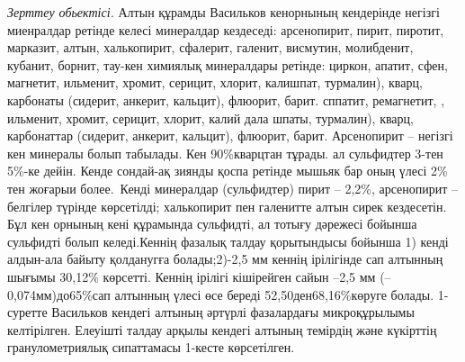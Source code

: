 \emph{Зерттеу обьектісі.} Алтын құрамды Васильков кенорнының кендерінде
негізгі миенралдар ретінде келесі минералдар кездеседі: арсенопирит,
пирит, пиротит, марказит, алтын, халькопирит, сфалерит, галенит,
висмутин, молибденит, кубанит, борнит, тау-кен химиялық минералдары
ретінде: циркон, апатит, сфен, магнетит, ильменит, хромит, серицит,
хлорит, калишпат, турмалин), кварц, карбонаты (сидерит, анкерит,
кальцит), флюорит, барит. сппатит, ремагнетит, , ильменит, хромит,
серицит, хлорит, калий дала шпаты, турмалин), кварц, карбонаттар
(сидерит, анкерит, кальцит), флюорит, барит. Арсенопирит -- негізгі кен
минералы болып табылады. Кен 90\%кварцтан тұрады. ал сульфидтер 3-тен
5\%-ке дейін. Кенде сондай-ақ зиянды қоспа ретінде мышьяк бар оның үлесі
2\% тен жоғарыи более.~Кенді минералдар (сульфидтер) пирит -- 2,2\%,
арсенопирит -- белгілер түрінде көрсетілді; халькопирит пен галенитте
алтын сирек кездесетін. Бұл кен орнының кені құрамында сульфидті, ал
тотығу дәрежесі бойынша сульфидті болып келеді.Кеннің фазалық талдау
қорытындысы бойынша 1) кенді алдын-ала байыту қолданугға болады;2)-2,5
мм кеннің ірілігінде сап алтынның шығымы 30,12\% көрсетті. Кеннің
ірілігі кішірейген сайын --2,5 мм (--0,074мм)до65\%сап алтынның үлесі
өсе береді 52,50ден68,16\%көруге болады. 1-суретте Васильков кендегі
алтының әртүрлі фазалардағы микроқұрылымы келтірілген. Елеуішті талдау
арқылы кендегі алтының темірдің және күкірттің гранулометриялық
сипаттамасы 1-кесте көрсетілген.

% 
% 
% 

